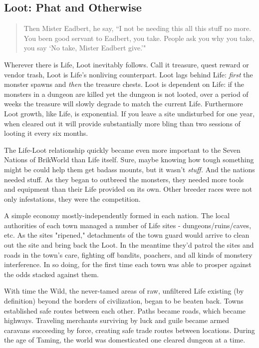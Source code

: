 \documentclass[12pt,a4paper,twocolumn]{article}
\begin{document}
\subsection{Loot: Phat and Otherwise}
\begin{quote}
Then Mister Eadbert, he say, ``I not be needing this all this stuff no more.  You been good servant to Eadbert, you take.  People ask you why you take, you say `No take, Mister Eadbert give.'"
\end{quote}

Wherever there is Life, Loot inevitably follows.  Call it treasure, quest reward or vendor trash, Loot is Life's nonliving counterpart.  Loot lags behind Life: {\em first} the monster spawns and {\em then} the treasure chests.  Loot is dependent on Life: if the monsters in a dungeon are killed yet the dungeon is not looted, over a period of weeks the treasure will slowly degrade to match the current Life.  Furthermore Loot growth, like Life, is exponential.  If you leave a site undisturbed for one year, when cleared out it will provide substantially more bling than two sessions of looting it every six months.

The Life-Loot relationship quickly became even more important to the Seven Nations of BrikWorld than Life itself.  Sure, maybe knowing how tough something might be could help them get badass mounts, but it wasn't {\em stuff.}  And the nations needed stuff.  As they began to outbreed the monsters, they needed more tools and equipment than their Life provided on its own.  Other breeder races were not only infestations, they were the competition.

A simple economy mostly-independently formed in each nation.  The local authorities of each town managed a number of Life sites - dungeons/ruins/caves, etc.  As the sites "ripened," detachments of the town guard would arrive to clean out the site and bring back the Loot.  In the meantime they'd patrol the sites and roads in the town's care, fighting off bandits, poachers, and all kinds of monstery interference.  In so doing, for the first time each town was able to prosper against the odds stacked against them.

With time the Wild, the never-tamed areas of raw, unfiltered Life existing (by definition) beyond the borders of civilization, began to be beaten back.  Towns established safe routes between each other.  Paths became roads, which became highways.  Traveling merchants surviving by luck and guile became armed caravans succeeding by force, creating safe trade routes between locations.  During the age of Taming, the world was domesticated one cleared dungeon at a time.
\end{document}
